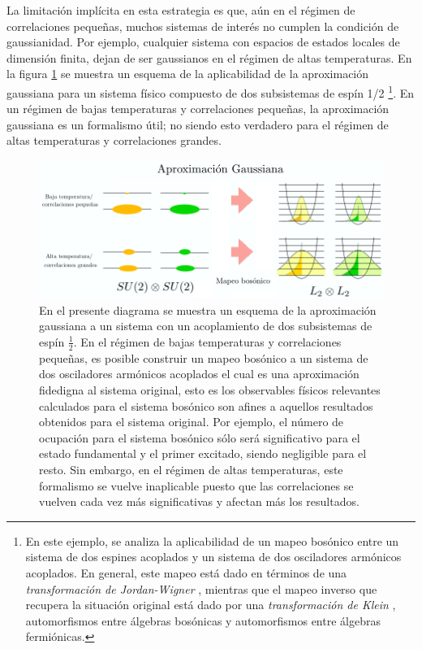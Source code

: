 \documentclass{report} %
\numberwithin{equation}{section}
\begin{document}
La limitación implícita en esta estrategia es que, aún en el régimen de correlaciones pequeñas, muchos sistemas de interés no  cumplen la condición de gaussianidad. Por ejemplo, cualquier sistema con espacios de estados locales de dimensión finita, dejan de ser gaussianos en el régimen de altas temperaturas. En la figura \ref{Aproximacion Gaussiana} se muestra un esquema de la aplicabilidad de la aproximación gaussiana para un sistema físico compuesto de dos subsistemas de espín 1/2 \footnote{En este ejemplo, se analiza la aplicabilidad de un mapeo bosónico entre un sistema de dos espines acoplados y un sistema de dos osciladores armónicos acoplados. En general, este mapeo está dado en términos de una \textit{transformación de Jordan-Wigner} \cite{Nielsen.00}, mientras que el mapeo inverso que recupera la situación original está dado por una \textit{transformación de Klein} \cite{ringwood}, automorfismos entre álgebras bosónicas y automorfismos entre álgebras fermiónicas.}. En un régimen de bajas temperaturas y correlaciones pequeñas, la aproximación gaussiana es un formalismo útil; no siendo esto verdadero para el régimen de altas temperaturas y correlaciones grandes. 
\begin{figure}
    \centering
    \includegraphics[scale = 0.57]{figs/Aproximacion Gaussiana.png}
    \caption{En el presente diagrama se muestra un esquema de la aproximación gaussiana a un sistema con un acoplamiento de dos subsistemas de espín $\frac{1}{2}$. En el régimen de bajas temperaturas y correlaciones pequeñas, es posible construir un mapeo bosónico a un sistema de dos osciladores armónicos acoplados el cual es una aproximación fidedigna al sistema original, esto es los observables físicos relevantes calculados para el sistema bosónico son afines a aquellos resultados obtenidos para el sistema original. Por ejemplo, el número de ocupación para el sistema bosónico sólo será significativo para el estado fundamental y el primer excitado, siendo negligible para el resto. Sin embargo, en el régimen de altas temperaturas, este formalismo se vuelve inaplicable puesto que las correlaciones se vuelven cada vez más significativas y afectan más los resultados.}
    \label{Aproximacion Gaussiana}
\end{figure}
\end{document}

